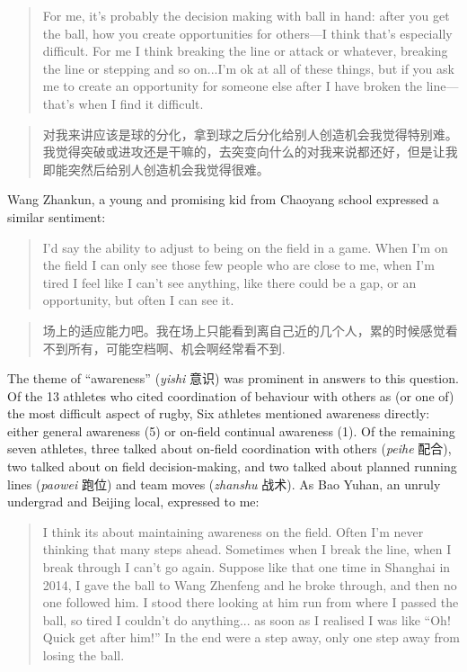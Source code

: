 \begin{CJK}{UTF8}{gbsn}
\begin{quotation}
  For me, it's probably the decision making with ball in hand: after you get the ball, how you create opportunities for others---I think that's especially difficult.  For me I think breaking the line or attack or whatever, breaking the line or stepping and so on...I'm ok at all of these things, but if you ask me to create an opportunity for someone else after I have broken the line---that's when I find it difficult.
\end{quotation}

\begin{quotation}
  对我来讲应该是球的分化，拿到球之后分化给别人创造机会我觉得特别难。我觉得突破或进攻还是干嘛的，去突变向什么的对我来说都还好，但是让我即能突然后给别人创造机会我觉得很难。
\end{quotation}

Wang Zhankun, a young and promising kid from Chaoyang school expressed a similar sentiment:

\begin{quotation}
  I’d say the ability to adjust to being on the field in a game.  When I’m on the field I can only see those few people who are close to me, when I’m tired I feel like I can’t see anything, like there could be a gap, or an opportunity, but often I can see it.
\end{quotation}

\begin{quotation}
  场上的适应能力吧。我在场上只能看到离自己近的几个人，累的时候感觉看不到所有，可能空档啊、机会啊经常看不到.
\end{quotation}

The theme of ``awareness'' (\textit{yishi} 意识) was prominent in answers to this question. Of the 13 athletes who cited coordination of behaviour with others as (or one of) the most difficult aspect of rugby,  Six athletes mentioned awareness directly: either general awareness (5) or on-field continual awareness (1).  Of the remaining seven athletes, three talked about on-field coordination with others (\textit{peihe} 配合), two talked about on field decision-making, and two talked about planned running lines (\textit{paowei} 跑位) and team moves (\textit{zhanshu} 战术). As Bao Yuhan, an unruly undergrad and Beijing local, expressed to me:

  \begin{quotation}
    I think its about maintaining awareness on the field. Often I'm never thinking that many steps ahead.  Sometimes when I break the line, when I break through I can't go again. Suppose like that one time in Shanghai in 2014, I gave the ball to Wang Zhenfeng and he broke through, and then no one followed him.  I stood there looking at him run from where I passed the ball, so tired I couldn't do anything... as soon as I realised I was like ``Oh! Quick get after him!'' In the end were a step away, only one step away from losing the ball.
  \end{quotation}


\end{CJK}
